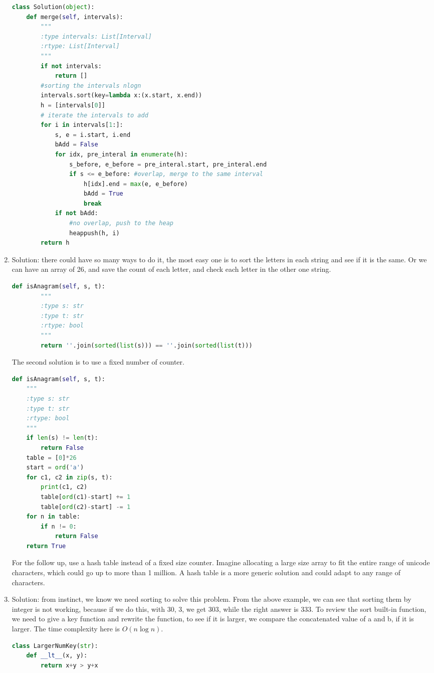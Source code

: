 \documentclass[../main.tex]{subfiles}
\begin{document}
\begin{enumerate}
\begin{lstlisting}[language = Python]
class Solution(object):
    def merge(self, intervals):
        """
        :type intervals: List[Interval]
        :rtype: List[Interval]
        """
        if not intervals:
            return []
        #sorting the intervals nlogn
        intervals.sort(key=lambda x:(x.start, x.end))
        h = [intervals[0]]
        # iterate the intervals to add
        for i in intervals[1:]:
            s, e = i.start, i.end
            bAdd = False
            for idx, pre_interal in enumerate(h):
                s_before, e_before = pre_interal.start, pre_interal.end
                if s <= e_before: #overlap, merge to the same interval
                    h[idx].end = max(e, e_before)
                    bAdd = True
                    break
            if not bAdd:
                #no overlap, push to the heap
                heappush(h, i)        
        return h
\end{lstlisting}

\item Solution: there could have so many ways to do it, the most easy one is to sort the letters in each string and see if it is the same. Or we can have an array of 26, and save the count of each letter, and check each letter in the other one string. 
\begin{lstlisting}[language = Python]
def isAnagram(self, s, t):
        """
        :type s: str
        :type t: str
        :rtype: bool
        """
        return ''.join(sorted(list(s))) == ''.join(sorted(list(t)))
\end{lstlisting}
The second solution is to use a fixed number of counter.
\begin{lstlisting}[language = Python]
def isAnagram(self, s, t):
    """
    :type s: str
    :type t: str
    :rtype: bool
    """
    if len(s) != len(t):
        return False
    table = [0]*26
    start = ord('a')
    for c1, c2 in zip(s, t):
        print(c1, c2)
        table[ord(c1)-start] += 1
        table[ord(c2)-start] -= 1
    for n in table:
        if n != 0:
            return False
    return True
\end{lstlisting}
For the follow up, use a hash table instead of a fixed size counter. Imagine allocating a large size array to fit the entire range of unicode characters, which could go up to more than 1 million. A hash table is a more generic solution and could adapt to any range of characters.

\item Solution: from instinct, we know we need sorting to solve this problem. From the above example, we can see that sorting them by integer is not working, because if we do this, with 30, 3, we get 303, while the right answer is 333. To review the sort built-in function, we need to give a key function and rewrite the function, to see if it is larger, we compare the concatenated value of a and b, if it is larger.  The time complexity here is $O(n\log n)$.
\begin{lstlisting}[language = Python]
class LargerNumKey(str):
    def __lt__(x, y):
        return x+y > y+x
        

\end{lstlisting}
\end{enumerate}
\end{document}
